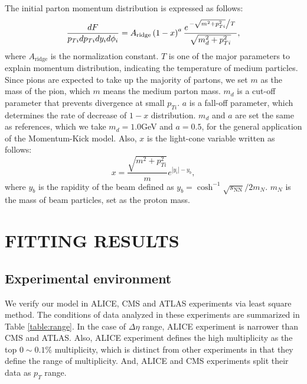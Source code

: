 \documentclass[jkps,fleqn,showpacs,showkeys]{revtex4}
\begin{document}
The initial parton momentum distribution is expressed as follows:
\begin{equation} \label{equation:eq6}
\frac{dF}{p_{Ti}dp_{Ti}dy_id\phi_i}=A_{\text{ridge}}\left(1-x\right)^a\frac{e^{ \left. -\sqrt{m^2+p_{Ti}^2} \middle/ T \right. }}{\sqrt{m_d^2+p_{Ti}^2}},
\end{equation}
where $A_{\text{ridge}}$ is the normalization constant.
$T$ is one of the major parameters to explain momentum distribution, indicating the temperature of medium particles.
Since pions are expected to take up the majority of partons, we set $m$ as the mass of the pion, which $m$ means the medium parton mass.
$m_d$ is a cut-off parameter that prevents divergence at small $p_{Ti}$.
$a$ is a fall-off parameter, which determines the rate of decrease of $1-x$ distribution.
$m_d$ and $a$ are set the same as references\cite{PbPb, Wong_1}, which we take $m_d = 1.0$GeV and $a = 0.5$, for the general application of the Momentum-Kick model\cite{Wong_1}.
Also, $x$ is the light-cone variable written as follows:
\begin{equation} \label{equation:eq8}
x=\frac{\sqrt{m^2+p_{Ti}^2}}{m}e^{\left|y_i\right|-y_b},
\end{equation}
where $y_b$ is the rapidity of the beam defined as $y_b=\cosh^{-1}{\sqrt{s_\text{NN}}/2m_N}$. $m_N$ is the mass of beam particles, set as the proton mass.


\section*{FITTING RESULTS}
\label{sec:Fitting results}

\subsection{Experimental environment}
\label{subsec:Experimental environment}

We verify our model in ALICE, CMS and ATLAS experiments\cite{alice,cms,atlas} via least square method.
The conditions of data analyzed in these experiments are summarized in Table \ref{table:range}.
In the case of $\Delta\eta$ range, ALICE experiment is narrower than CMS and ATLAS.
Also, ALICE experiment defines the high multiplicity as the top $0\sim0.1\%$ multiplicity, which is distinct from other experiments in that they define the range of multiplicity.
And, ALICE and CMS experiments split their data as $p_T$ range.
\end{document}
